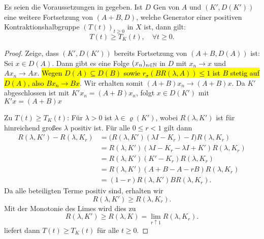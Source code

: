 

\begin{fsatz}\cite{banasiak_arlotti_2006}\label{Minimalität von K}
Es seien  die Voraussetzungen in  gegeben. Ist $D$ Gen von $A$ und $(K', D(K'))$ eine weitere Fortsetzung von $(A+B, D)$, welche Generator einer  positiven Kontraktionshalbgruppe $(T(t))_{t\geq0}$ in $X$ ist, dann gilt:
\begin{equation*}
T(t)\geq T_K(t),\quad \forall t\geq0.
\end{equation*}
\end{fsatz}

\begin{proof}
\par 
Zeige, dass $(K', D(K'))$ bereits Fortsetzung von $(A+B, D(A))$ ist: Sei  $x\in D(A)$. Dann gibt es eine Folge $(x_n)_{n\in\mathbb{N}}$ in $D$ mit $x_n \to x$ und $Ax_n\to Ax$.\hl{ Wegen $D(A)\subseteq D(B)$ sowie $r_\sigma(BR(\lambda, A))\leq 1$ ist $B$ stetig auf $D(A)$, also $Bx_n\to Bx$}. Wir erhalten somit $(A+B)x_n\to (A+B)x$. Da $K'$ abgeschlossen ist mit $K'x_n  = (A+B)x_n$, folgt $x\in D(K')$ mit  $K'x=(A+B)x$

\par
Zu $T(t)\geq T_K(t)$: Für $\lambda >0$ ist $\lambda\in \varrho(K')$, wobei $R(\lambda, K')$ ist für hinreichend großes $\lambda$ positiv ist. Für alle $0\leq r <1$ gilt dann
\begin{align*}
R(\lambda, K') - R(\lambda, K_r)
&= \big(R(\lambda, K')(\lambda I- K_r)-I\big)R(\lambda, K_r)\\
&= R(\lambda, K')(\lambda I- K_r - \lambda I+  K')R(\lambda, K_r)\\
&= R(\lambda, K')(K' - K_r)R(\lambda, K_r)\\
&= R(\lambda, K')(A+B - A - rB)R(\lambda, K_r)\\
&= (1-r)R(\lambda, K')BR(\lambda,  K_r).
\end{align*}
Da alle beteiligten Terme positiv sind, erhalten wir
\begin{equation*}
R(\lambda, K')\geq R(\lambda, K_r).
\end{equation*}
Mit der Monotonie des Limes wird dies zu
\begin{equation*}
R(\lambda, K')\geq R(\lambda, K) = \lim_{r\uparrow 1}R(\lambda, K_r).
\end{equation*}
 liefert dann $T(t)\geq T_K(t)$ für alle $t\geq0$.
\end{proof}


